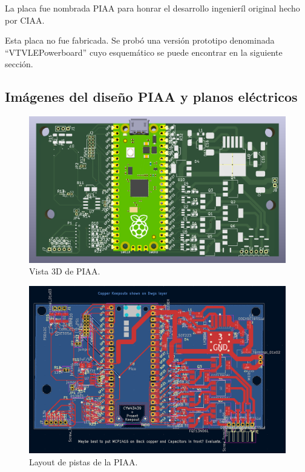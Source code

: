 La placa fue nombrada PIAA para honrar el desarrollo ingenieríl original hecho por CIAA.

Esta placa no fue fabricada. Se probó una versión prototipo denominada ``VTVLEPowerboard'' cuyo esquemático se puede encontrar en la siguiente sección.
\null\newpage
\clearpage
\subsection{Imágenes del diseño PIAA y planos eléctricos} 

\begin{figure}[htb]
    \centering
    \includegraphics[width=0.8\linewidth]{fig/piaa3d.png}
    \caption{Vista 3D de PIAA.}
    \label{fig:piaa3d}
\end{figure}

\begin{figure}[htb]
    \centering
    \includegraphics[width=0.8\linewidth]{fig/piaa_layout.png}
    \caption{Layout de pistas de la PIAA.}
    \label{fig:layoutpiaa}
\end{figure}

\clearpage




